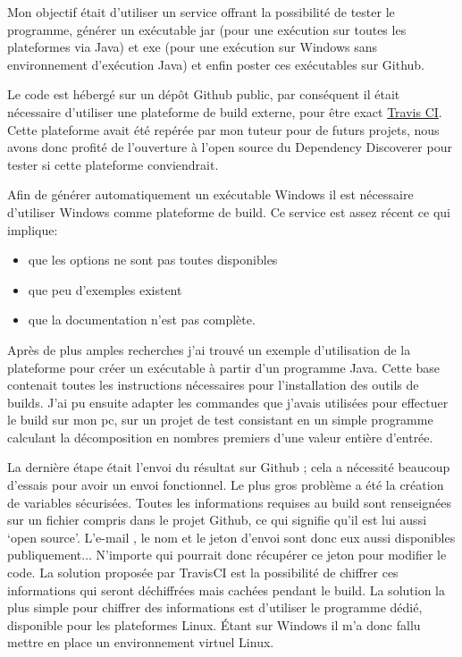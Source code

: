 \documentclass[french,a4paper,12pt]{report}
\begin{document}
Mon objectif était d'utiliser un service offrant la possibilité de tester le programme, générer un exécutable jar (pour une exécution sur toutes les plateformes via Java) et exe (pour une exécution sur Windows sans environnement d’exécution Java) et enfin poster ces exécutables sur Github. 

Le code est hébergé sur un dépôt Github public, par conséquent il était nécessaire d’utiliser une plateforme de build externe, pour être exact \href{https://travis-ci.com/}{Travis CI}. Cette plateforme avait été repérée par mon tuteur pour de futurs projets, nous avons donc profité de l'ouverture à l'open source du Dependency Discoverer pour tester si cette plateforme conviendrait.

Afin de générer automatiquement un exécutable Windows il est nécessaire d’utiliser Windows comme plateforme de build. Ce service est assez récent ce qui implique:

\begin{itemize}

 \item que les options ne sont pas toutes disponibles
 \item que peu d’exemples existent
 \item que la documentation n’est pas complète.

\end{itemize}

Après de plus amples recherches j’ai trouvé un exemple d’utilisation de la plateforme pour créer un exécutable à partir d’un programme Java. Cette base contenait toutes les instructions nécessaires pour l’installation des outils de builds. J’ai pu ensuite adapter les commandes que j’avais utilisées pour effectuer le build sur mon pc, sur un projet de test consistant en un simple programme calculant la décomposition en nombres premiers d'une valeur entière d'entrée.

La dernière étape était l’envoi du résultat sur Github ; cela a nécessité beaucoup d'essais pour avoir un envoi fonctionnel. Le plus gros problème a été la création de variables sécurisées. Toutes les informations requises au build sont renseignées sur un fichier compris dans le projet Github, ce qui signifie qu’il est lui aussi ‘open source’. L’e-mail , le nom et le jeton d’envoi sont donc eux aussi disponibles publiquement... N’importe qui pourrait donc récupérer ce jeton pour modifier le code. La solution proposée par TravisCI est la possibilité de chiffrer ces informations qui seront déchiffrées mais cachées pendant le build. La solution la plus simple pour chiffrer des informations est d’utiliser le programme dédié, disponible pour les plateformes Linux. Étant sur Windows il m’a donc fallu mettre en place un environnement virtuel Linux.
\end{document}

